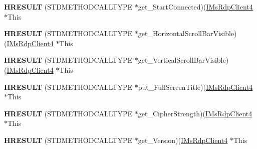 \begin{DoxyCompactItemize}
\item 
\mbox{\label{struct_m_s_t_s_c_lib_1_1_i_ms_rdp_client4_vtbl_ad6543bf24e11d26f72af067bf0479768}} 
{\bfseries H\+R\+E\+S\+U\+LT} (S\+T\+D\+M\+E\+T\+H\+O\+D\+C\+A\+L\+L\+T\+Y\+PE $\ast$get\+\_\+\+Start\+Connected)(\hyperlink{interface_m_s_t_s_c_lib_1_1_i_ms_rdp_client4}{I\+Ms\+Rdp\+Client4} $\ast$This
\item 
\mbox{\label{struct_m_s_t_s_c_lib_1_1_i_ms_rdp_client4_vtbl_aaee7dafac453dd002c9e209eaf981deb}} 
{\bfseries H\+R\+E\+S\+U\+LT} (S\+T\+D\+M\+E\+T\+H\+O\+D\+C\+A\+L\+L\+T\+Y\+PE $\ast$get\+\_\+\+Horizontal\+Scroll\+Bar\+Visible)(\hyperlink{interface_m_s_t_s_c_lib_1_1_i_ms_rdp_client4}{I\+Ms\+Rdp\+Client4} $\ast$This
\item 
\mbox{\label{struct_m_s_t_s_c_lib_1_1_i_ms_rdp_client4_vtbl_af61f2bf4f972dcbeeff7ff524d97978a}} 
{\bfseries H\+R\+E\+S\+U\+LT} (S\+T\+D\+M\+E\+T\+H\+O\+D\+C\+A\+L\+L\+T\+Y\+PE $\ast$get\+\_\+\+Vertical\+Scroll\+Bar\+Visible)(\hyperlink{interface_m_s_t_s_c_lib_1_1_i_ms_rdp_client4}{I\+Ms\+Rdp\+Client4} $\ast$This
\item 
\mbox{\label{struct_m_s_t_s_c_lib_1_1_i_ms_rdp_client4_vtbl_a6dcd9cb8741b2124330f90ab28840e25}} 
{\bfseries H\+R\+E\+S\+U\+LT} (S\+T\+D\+M\+E\+T\+H\+O\+D\+C\+A\+L\+L\+T\+Y\+PE $\ast$put\+\_\+\+Full\+Screen\+Title)(\hyperlink{interface_m_s_t_s_c_lib_1_1_i_ms_rdp_client4}{I\+Ms\+Rdp\+Client4} $\ast$This
\item 
\mbox{\label{struct_m_s_t_s_c_lib_1_1_i_ms_rdp_client4_vtbl_a1d7b8b3895468ea88459265ddce47946}} 
{\bfseries H\+R\+E\+S\+U\+LT} (S\+T\+D\+M\+E\+T\+H\+O\+D\+C\+A\+L\+L\+T\+Y\+PE $\ast$get\+\_\+\+Cipher\+Strength)(\hyperlink{interface_m_s_t_s_c_lib_1_1_i_ms_rdp_client4}{I\+Ms\+Rdp\+Client4} $\ast$This
\item 
\mbox{\label{struct_m_s_t_s_c_lib_1_1_i_ms_rdp_client4_vtbl_a5d41119ce71064fe64abf5084d819041}} 
{\bfseries H\+R\+E\+S\+U\+LT} (S\+T\+D\+M\+E\+T\+H\+O\+D\+C\+A\+L\+L\+T\+Y\+PE $\ast$get\+\_\+\+Version)(\hyperlink{interface_m_s_t_s_c_lib_1_1_i_ms_rdp_client4}{I\+Ms\+Rdp\+Client4} $\ast$This

\end{DoxyCompactItemize}
